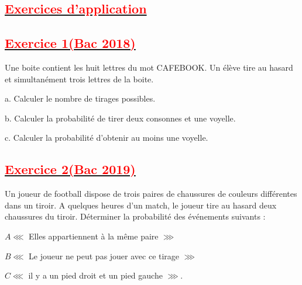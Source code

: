 \documentclass[12pt]{article}
\begin{document}
\subsection*{\underline{\textbf{\textcolor{red}{Exercices d’application}}}}
\subsection*{\underline{\textbf{\textcolor{red}{Exercice 1(Bac 2018)}}}}
Une boite contient les huit lettres du mot CAFEBOOK. Un élève tire au hasard et simultanément 
trois lettres de la boite.

a. Calculer le nombre de tirages possibles.

b. Calculer la probabilité de tirer deux consonnes et une voyelle.

c. Calculer la probabilité d’obtenir au moins une voyelle.
\subsection*{\underline{\textbf{\textcolor{red}{Exercice 2(Bac 2019)}}}}
Un joueur de football dispose de trois paires de chaussures de couleurs différentes dans un tiroir. 
A quelques heures d’un match, le joueur tire au hasard deux chaussures du tiroir. Déterminer la 
probabilité des événements suivants :

$A \lll$ Elles appartiennent à la même paire $\ggg$

$B \lll$ Le joueur ne peut pas jouer avec ce tirage $\ggg$

$C \lll$ il y a un pied droit et un pied gauche $\ggg$.
\end{document}
